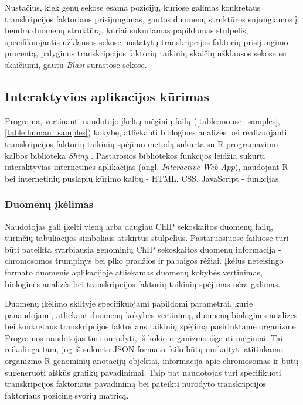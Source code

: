 \documentclass[12pt]{article}
\begin{document}
Nustačius, kiek genų sekose esama pozicijų, kuriose galimas konkretaus
transkripcijos faktoriaus prisijungimas, gautos duomenų struktūros sujungiamos
į bendrą duomenų struktūrą, kuriai sukuriamas papildomas stulpelis,
specifikuojantis užklausos sekose nustatytų transkripcijos faktorių
prisijungimo procentą, palyginus transkripcijos faktorių taikinių skaičių
užklausos sekose su skaičiumi, gautu \emph{Blast} surastose sekose. 

\newpage

\subsection{Interaktyvios aplikacijos kūrimas}
Programa, vertinanti naudotojo įkeltų mėginių failų
(\ref{table:mouse_samples}, \ref{table:human_samples}) kokybę, atliekanti
biologines analizes bei realizuojanti transkripcijos faktorių taikinių spėjimo
metodą sukurta su R programavimo kalbos biblioteka \emph{Shiny} \cite{SHINY}.
Pastarosios bibliotekos funkcijos leidžia sukurti interaktyvias internetines
aplikacijas (angl. \emph{Interactive Web App}), naudojant R bei internetinių
puslapių kūrimo kalbų - HTML, CSS, JavaScript - funkcijas.

\subsubsection*{Duomenų įkėlimas}
Naudotojas gali įkelti vieną arba daugiau ChIP sekoskaitos duomenų failų,
turinčių tabuliacijos simboliais atskirtus stulpelius. Pastaruosiuose failuose
turi būti pateikta svarbiausia genominių ChIP sekoskaitos duomenų informacija -
chromosomos trumpinys bei piko pradžios ir pabaigos rėžiai. Įkėlus neteisingo
formato duomenis aplikacijoje atliekamas duomenų kokybės vertinimas, biologinės
analizės bei transkripcijos faktorių taikinių spėjimas nėra galimas.

Duomenų įkėlimo skiltyje specifikuojami papildomi parametrai, kurie panaudojami,
atliekant duomenų kokybės vertinimą, duomenų biologines analizes bei konkretaus
transkripcijos faktoriaus taikinių spėjimą pasirinktame organizme. Programos
naudotojas turi nurodyti, iš kokio organizmo išgauti mėginiai. Tai reikalinga
tam, jog iš sukurto JSON \cite{JSON} formato failo būtų nuskaityti atitinkamo
organizmo R genominių anotacijų objektai, informacija apie chromosomas ir būtų
sugeneruoti aiškūs grafikų pavadinimai. Taip pat naudotojas turi specifikuoti
transkripcijos faktoriaus pavadinimą bei pateikti nurodyto transkripcijos
faktoriaus pozicinę svorių matricą.
\end{document}
